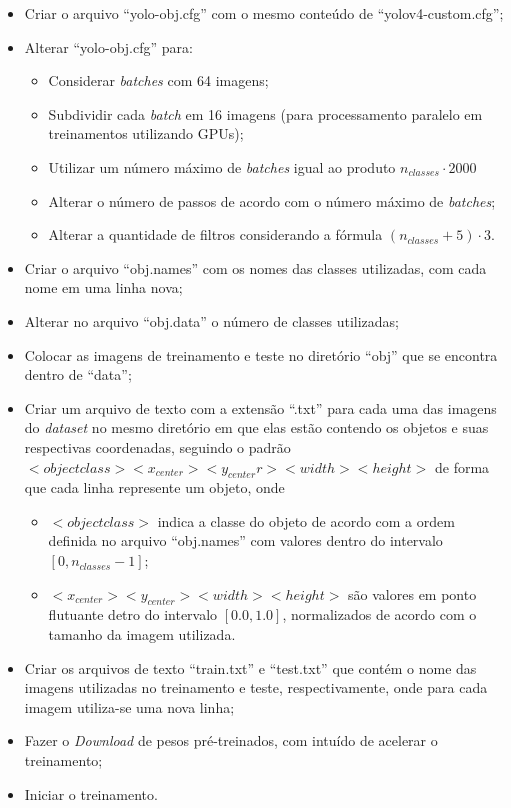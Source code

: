 \begin{itemize}
  \item Criar o arquivo ``yolo-obj.cfg'' com o mesmo conteúdo de ``yolov4-custom.cfg'';
  \item Alterar ``yolo-obj.cfg'' para:
  \begin{itemize}
    \item Considerar \textit{batches} com 64 imagens;
    \item Subdividir cada \textit{batch} em 16 imagens (para processamento paralelo em treinamentos utilizando GPUs);
    \item Utilizar um número máximo de \textit{batches} igual ao produto $n_{classes} \cdot 2000$
    \item Alterar o número de passos de acordo com o número máximo de \textit{batches};
    \item Alterar a quantidade de filtros considerando a fórmula $(n_{classes} + 5) \cdot 3$.
  \end{itemize}
  \item Criar o arquivo ``obj.names'' com os nomes das classes utilizadas, com cada nome em uma linha nova;
  \item Alterar no arquivo ``obj.data'' o número de classes utilizadas;
  \item Colocar as imagens de treinamento e teste no diretório ``obj'' que se encontra dentro de ``data'';
  \item Criar um arquivo de texto com a extensão ``.txt'' para cada uma das imagens do \textit{dataset} no mesmo diretório em que elas estão contendo os objetos e suas respectivas coordenadas, seguindo o padrão  $<objectclass> <x_{center}> <y_{center}r> <width> <height>$ de forma que cada linha represente um objeto, onde
  \begin{itemize}
    \item $<objectclass>$ indica a classe do objeto de acordo com a ordem definida no arquivo ``obj.names'' com valores dentro do intervalo $[0, n_{classes} - 1]$;
    \item $<x_{center}> <y_{center}> <width> <height>$ são valores em ponto flutuante detro do intervalo $[0.0, 1.0]$, normalizados de acordo com o tamanho da imagem utilizada.
  \end{itemize}
  \item Criar os arquivos de texto ``train.txt'' e ``test.txt'' que contém o nome das imagens utilizadas no treinamento e teste, respectivamente, onde para cada imagem utiliza-se uma nova linha;
  \item Fazer o \textit{Download} de pesos pré-treinados, com intuído de acelerar o treinamento;
  \item Iniciar o treinamento.
\end{itemize}

